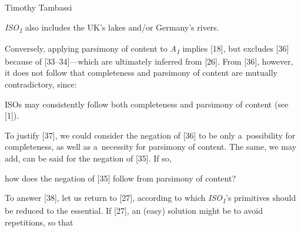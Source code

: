 \begin{artengenv}{Timothy Tambassi}
\begin{enumerate}[label={[\arabic*]}]
\item \textit{ISO}\textit{\textsubscript{1}} also includes the UK's lakes and/or Germany's rivers.

\end{enumerate}

Conversely, applying parsimony of content to \textit{A}\textit{\textsubscript{1}} implies [18], but excludes [36] because of [33–34]---which are ultimately inferred from [26]. From [36], however, it does not follow that completeness and parsimony of content are mutually contradictory, since:



\setcounter{saveenumtambassi}{\value{enumi}}

\begin{enumerate}[label={[\arabic*]}]

\setcounter{enumi}{\value{saveenumtambassi}}

\item ISOs may consistently follow both completeness and parsimony of content (see [1]).

\end{enumerate}

To justify [37], we could consider the negation of [36] to be only a~possibility for completeness, as well as a~necessity for parsimony of content. The same, we may add, can be said for the negation of [35]. If so,



\setcounter{saveenumtambassi}{\value{enumi}}

\begin{enumerate}[label={[\arabic*]}]

\setcounter{enumi}{\value{saveenumtambassi}}

\item how does the negation of [35] follow from parsimony of content?

\end{enumerate}

To answer [38], let us return to [27], according to which \textit{ISO}\textit{\textsubscript{1}}'s primitives should be reduced to the essential. If [27], an (easy) solution might be to avoid repetitions, so that



\setcounter{saveenumtambassi}{\value{enumi}}

\begin{enumerate}[label={[\arabic*]}]

\setcounter{enumi}{\value{saveenumtambassi}}


\end{enumerate}
\end{artengenv}
